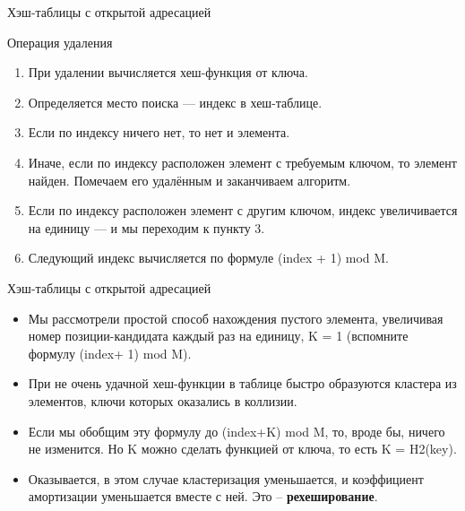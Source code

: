 \documentclass{beamer}
\begin{document}
\begin{frame}{Хэш-таблицы с открытой адресацией}
    \begin{block}{Операция удаления}
        \begin{enumerate}
            \item При удалении вычисляется хеш-функция от ключа.
            \item Определяется место поиска — индекс в хеш-таблице.
            \item Если по индексу ничего нет, то нет и элемента.
            \item Иначе, если по индексу расположен элемент с требуемым ключом, то элемент найден. Помечаем его удалённым и заканчиваем алгоритм.
            \item Если по индексу расположен элемент с другим ключом, индекс увеличивается на единицу — и мы переходим к пункту 3.
            \item Следующий индекс вычисляется по формуле (index + 1) mod M.
        \end{enumerate}
    \end{block}
\end{frame} 

\begin{frame}{Хэш-таблицы с открытой адресацией}
    \begin{itemize}
        \item Мы рассмотрели простой способ нахождения пустого элемента, увеличивая номер позиции-кандидата каждый раз на единицу, K = 1 (вспомните
формулу (index+ 1) mod M). 
        \item При не очень удачной хеш-функции в таблице быстро образуются кластера из элементов, ключи которых оказались в коллизии. 
        \item Если мы обобщим эту формулу до (index+K) mod M, то, вроде бы, ничего не изменится. Но K можно сделать функцией от ключа, то есть K = H2(key). \item Оказывается, в этом случае кластеризация уменьшается, и коэффициент амортизации уменьшается вместе с ней. Это -- \textbf{рехеширование}.
    \end{itemize}
\end{frame} 
\end{document}
